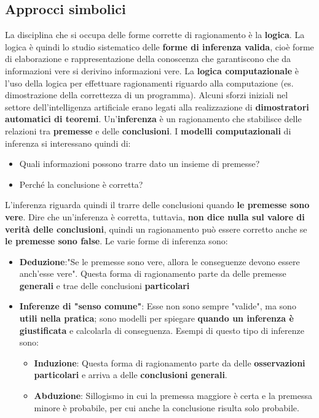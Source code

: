 \documentclass[12pt]{article}
\begin{document}
\subsection{Approcci simbolici}
La disciplina che si occupa delle forme corrette di ragionamento è la \textbf{logica}.
La logica è quindi lo studio sistematico delle \textbf{forme di inferenza valida}, cioè forme di elaborazione e rappresentazione della conoscenza
che garantiscono che da informazioni vere si derivino informazioni vere.
La \textbf{logica computazionale} è l'uso della logica per effettuare ragionamenti riguardo alla computazione (es. dimostrazione della correttezza di un programma).
Alcuni sforzi iniziali nel settore dell'intelligenza artificiale erano legati alla realizzazione di \textbf{dimostratori automatici di teoremi}. \newline 
Un'\textbf{inferenza} è un ragionamento che stabilisce delle relazioni tra \textbf{premesse} e delle \textbf{conclusioni}. I \textbf{modelli computazionali} di inferenza si interessano quindi di:
\begin{itemize}
    \item Quali informazioni possono trarre dato un insieme di premesse?
    \item Perché la conclusione è corretta?
\end{itemize}
L'inferenza riguarda quindi il trarre delle conclusioni quando \textbf{le premesse sono vere}.
Dire che un'inferenza è corretta, tuttavia, \textbf{non dice nulla sul valore di verità delle conclusioni}, quindi un ragionamento può essere corretto anche se \textbf{le premesse sono false}.
Le varie forme di inferenza sono:
\begin{itemize}
    \item \textbf{Deduzione}:"Se le premesse sono vere, allora le conseguenze devono essere anch'esse vere". Questa forma di ragionamento parte da delle premesse \textbf{generali} e trae delle conclusioni \textbf{particolari}
    \item \textbf{Inferenze di "senso comune"}: Esse non sono sempre "valide", ma sono \textbf{utili nella pratica}; sono modelli per spiegare \textbf{quando un inferenza è giustificata} e calcolarla di conseguenza. Esempi di questo tipo di inferenze sono:
    \begin{itemize}
        \item \textbf{Induzione}: Questa forma di ragionamento parte da delle \textbf{osservazioni particolari} e arriva a delle \textbf{conclusioni generali}.
        \item \textbf{Abduzione}: Sillogismo in cui la premessa maggiore è certa e la premessa minore è probabile, per cui anche la conclusione risulta solo probabile.
    \end{itemize}
\end{itemize}
\end{document}
